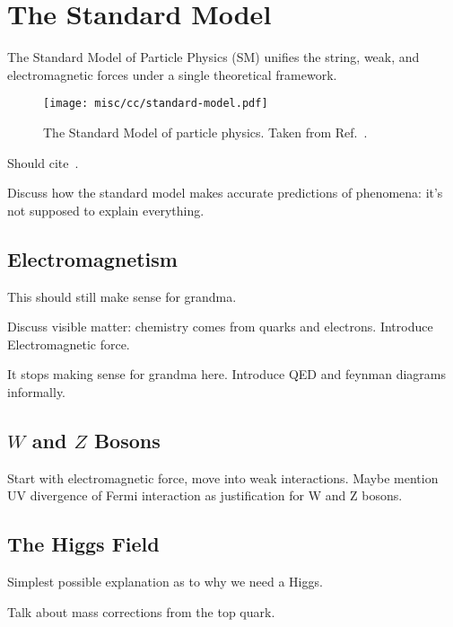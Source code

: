 \section{The Standard Model}
\label{sec:standard-model}
The Standard Model of Particle Physics (SM) unifies the string, weak, and electromagnetic forces under a single theoretical framework.
\begin{figure}
  \texttt{[image: misc/cc/standard-model.pdf]}
  \caption[The Standard Model of particle physics]{The Standard Model of particle physics. Taken from Ref.~\cite{smwiki}.}
\end{figure}

Should cite~\cite{ewuv,ewgaugeinvariance,weakinthev}.

Discuss how the standard model makes accurate predictions of phenomena: it's not supposed to explain everything.
\subsection{Electromagnetism}

This should still make sense for grandma.

Discuss visible matter: chemistry comes from quarks and electrons. Introduce Electromagnetic force.

It stops making sense for grandma here. Introduce QED and feynman diagrams informally.

\subsection{$W$ and $Z$ Bosons}
Start with electromagnetic force, move into weak interactions. Maybe mention UV divergence of Fermi interaction as justification for W and Z bosons.
\subsection{The Higgs Field}
Simplest possible explanation as to why we need a Higgs.

Talk about mass corrections from the top quark.


